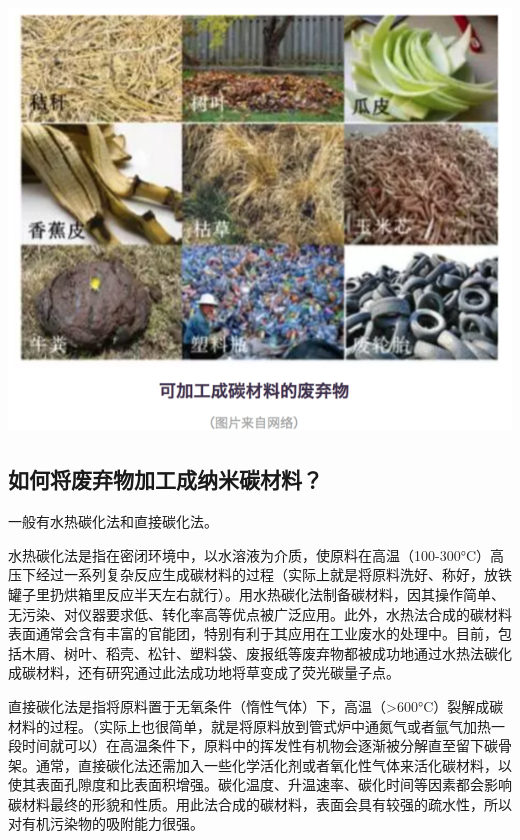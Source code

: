 \documentclass[]{book}
\begin{document}
\includegraphics[width=8.33in]{images/nano2}

\hypertarget{ux5982ux4f55ux5c06ux5e9fux5f03ux7269ux52a0ux5de5ux6210ux7eb3ux7c73ux78b3ux6750ux6599}{%
\subsection{如何将废弃物加工成纳米碳材料？}\label{ux5982ux4f55ux5c06ux5e9fux5f03ux7269ux52a0ux5de5ux6210ux7eb3ux7c73ux78b3ux6750ux6599}}

一般有水热碳化法和直接碳化法。

水热碳化法是指在密闭环境中，以水溶液为介质，使原料在高温（100-300°C）高压下经过一系列复杂反应生成碳材料的过程（实际上就是将原料洗好、称好，放铁罐子里扔烘箱里反应半天左右就行）。用水热碳化法制备碳材料，因其操作简单、无污染、对仪器要求低、转化率高等优点被广泛应用。此外，水热法合成的碳材料表面通常会含有丰富的官能团，特别有利于其应用在工业废水的处理中。目前，包括木屑、树叶、稻壳、松针、塑料袋、废报纸等废弃物都被成功地通过水热法碳化成碳材料，还有研究通过此法成功地将草变成了荧光碳量子点。

直接碳化法是指将原料置于无氧条件（惰性气体）下，高温（\textgreater{}600°C）裂解成碳材料的过程。（实际上也很简单，就是将原料放到管式炉中通氮气或者氩气加热一段时间就可以）在高温条件下，原料中的挥发性有机物会逐渐被分解直至留下碳骨架。通常，直接碳化法还需加入一些化学活化剂或者氧化性气体来活化碳材料，以使其表面孔隙度和比表面积增强。碳化温度、升温速率、碳化时间等因素都会影响碳材料最终的形貌和性质。用此法合成的碳材料，表面会具有较强的疏水性，所以对有机污染物的吸附能力很强。
\end{document}
